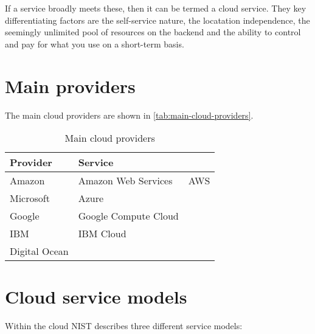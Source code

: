 If a service broadly meets these, then it can be termed a cloud service.
They key differentiating factors are the self-service nature, the
locatation independence, the seemingly unlimited pool of resources on
the backend and the ability to control and pay for what you use on a
short-term basis.

\section{Main providers}
\label{sec:main-providers}

The main cloud providers are shown in \autoref{tab:main-cloud-providers}.

\begin{table}
  \centering
  \begin{tabular}{l l l}
    \toprule
    \textbf{Provider} & \textbf{Service} & ~\\
    \midrule
    Amazon & Amazon Web Services & AWS\\
    Microsoft & Azure & ~\\
    Google & Google Compute Cloud &\\
    IBM & IBM Cloud &\\
    Digital Ocean & &\\
    \bottomrule
  \end{tabular}
  \caption{Main cloud providers}
  \label{tab:main-cloud-providers}
\end{table}

\section{Cloud service models}
\label{sec:cloud-service-models}

Within the cloud NIST describes three different service models:

